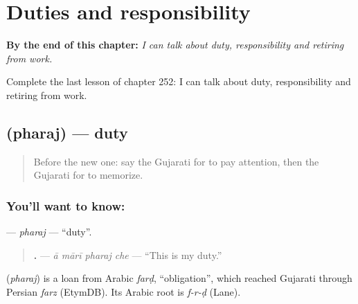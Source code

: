 
\chapter{Duties and responsibility}
\label{ch:gu-duties-and-responsibility}

\begin{chapteropening}
\textbf{By the end of this chapter:} \emph{I can talk about duty, responsibility and retiring from work.}

Complete the last lesson of chapter 252: I can talk about duty, responsibility and retiring from work.
\end{chapteropening}

\section[\texorpdfstring{\gu{ફરજ} (pharaj)}{ફરજ (pharaj)}]{ (pharaj) — duty}

\label{lesson:GU-C252-pharaj}



\begin{quote}
Before the new one: say the Gujarati for to pay attention, then the Gujarati for to memorize.
\end{quote}

\subsection*{You'll want to know: }
\textbf{} — \emph{pharaj} — \textquotedblleft{}duty\textquotedblright{}.

\begin{quote}
\textbf{   .} — \emph{ā mārī pharaj che} — \textquotedblleft{}This is my duty.\textquotedblright{}
\end{quote}

\begin{cousinweb}
\textbf{} (\emph{pharaj}) is a loan from Arabic \emph{farḍ}, \textquotedblleft{}obligation\textquotedblright{}, which reached Gujarati through Persian \emph{farz} (EtymDB). Its Arabic root is \emph{f-r-ḍ} (Lane).
\end{cousinweb}

